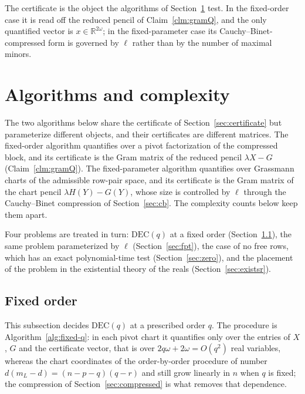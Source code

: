 \documentclass[journal]{IEEEtran}
\theoremstyle{plainn}
\theoremstyle{remark}
\begin{document}
The certificate is the object the algorithms of Section~\ref{sec:algorithms} test. In the fixed-order
case it is read off the reduced pencil of Claim~\ref{clm:gramQ}, and the only quantified vector is
$x\in\mathbb R^{2\omega}$; in the fixed-parameter case its Cauchy--Binet-compressed form is governed by
$\ell$ rather than by the number of maximal minors.

\section{Algorithms and complexity}\label{sec:algorithms}

The two algorithms below share the certificate of Section~\ref{sec:certificate} but parameterize
different objects, and their certificates are different matrices. The fixed-order algorithm quantifies
over a pivot factorization of the compressed block, and its certificate is the Gram matrix of the
reduced pencil $\lambda X-G$ (Claim~\ref{clm:gramQ}). The fixed-parameter algorithm quantifies over
Grassmann charts of the admissible row-pair space, and its certificate is the Gram matrix of the chart
pencil $\lambda H(Y)-G(Y)$, whose size is controlled by $\ell$ through the Cauchy--Binet compression of
Section~\ref{sec:cb}. The complexity counts below keep them apart.

Four problems are treated in turn: $\mathrm{DEC}(q)$ at a fixed order (Section~\ref{sec:fixedq}), the same problem parameterized by $\ell$ (Section~\ref{sec:fpt}), the case of no free rows, which has an exact polynomial-time test (Section~\ref{sec:zero}), and the placement of the problem in the existential theory of the reals (Section~\ref{sec:existsr}).

\subsection{Fixed order}\label{sec:fixedq}

This subsection decides $\mathrm{DEC}(q)$ at a prescribed order $q$. The procedure
is Algorithm~\ref{alg:fixed-q}: in each pivot chart it quantifies only over the
entries of $X$, $G$ and the certificate vector, that is over
$2q\omega+2\omega=O(q^2)$ real variables, whereas the chart coordinates of the
order-by-order procedure of \cite{fer26b} number $d(m_L-d)=(n-p-q)(q-r)$ and
still grow linearly in $n$ when $q$ is fixed; the compression of
Section~\ref{sec:compressed} is what removes that dependence.
\end{document}
